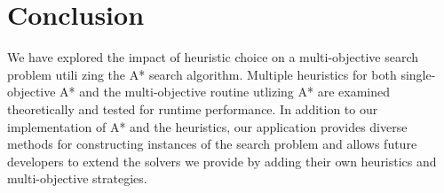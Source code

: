 \documentclass[12pt, conference, compsocconf]{IEEEtran}
\begin{document}
\section{Conclusion}
We have explored the impact of heuristic choice on a multi-objective search
problem utili zing the A* search algorithm.  Multiple heuristics for both
single-objective A* and the multi-objective routine utlizing A* are examined
theoretically and tested for runtime performance.  In addition to our
implementation of A* and the heuristics, our application provides diverse
methods for constructing instances of the search problem and allows future
developers to extend the solvers we provide by adding their own heuristics and
multi-objective strategies.


%
%
\end{document}
